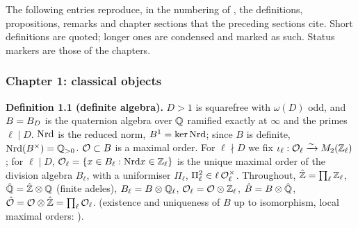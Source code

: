 
\noindent The following entries reproduce, in the numbering of \mainpdf, the definitions, propositions, remarks and chapter sections
that the preceding sections cite. Short definitions are quoted; longer ones are condensed and marked as such. Status markers are those
of the chapters.

\subsubsection*{Chapter 1: classical objects}

\noindent{}\label{rpt:def:s01-B}\textbf{Definition 1.1 (definite algebra).}
$D>1$ is squarefree with $\omega(D)$ odd, and $B=B_D$ is the quaternion algebra over $\mathbb{Q}$ ramified exactly at $\infty$
and the primes $\ell\mid D$. $\mathrm{Nrd}$ is the reduced norm, $B^1=\ker\mathrm{Nrd}$; since $B$ is definite, $\mathrm{Nrd}(B^\times)=\mathbb{Q}_{>0}$.
$\mathcal{O}\subset B$ is a maximal order. For $\ell\nmid D$ we fix $\iota_\ell:\mathcal{O}_\ell\xrightarrow{\sim}M_2(\mathbb{Z}_\ell)$; for $\ell\mid D$,
$\mathcal{O}_\ell=\{x\in B_\ell:\mathrm{Nrd} x\in\mathbb{Z}_\ell\}$ is the unique maximal order of the division algebra $B_\ell$, with a
uniformiser $\Pi_\ell$, $\Pi_\ell^2\in\ell\,\mathcal{O}_\ell^\times$.
Throughout, $\hat{\mathbb{Z}}=\prod_\ell\mathbb{Z}_\ell$, $\hat{\mathbb{Q}}=\hat{\mathbb{Z}}\otimes\mathbb{Q}$ (finite adeles), $B_\ell=B\otimes\mathbb{Q}_\ell$, $\mathcal{O}_\ell=\mathcal{O}\otimes\mathbb{Z}_\ell$,
$\hat B=B\otimes\hat{\mathbb{Q}}$, $\hat{\mathcal{O}}=\mathcal{O}\otimes\hat{\mathbb{Z}}=\prod_\ell\mathcal{O}_\ell$.
\stknown{} (existence and uniqueness of $B$ up to isomorphism, local maximal orders: \cite[Thm.~13.3.11, p.~206; Prop.~13.3.4, p.~205]{Vo}).

